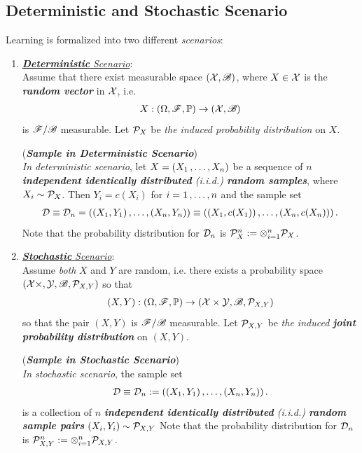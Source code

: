 \documentclass[11pt]{article}
\begin{document}
\subsection{Deterministic and Stochastic Scenario}
Learning is formalized into two different \emph{scenarios}:
\begin{enumerate}
\item  \underline{\emph{\textbf{Deterministic}} \emph{Scenario}}: \\
Assume that there exist measurable space $({\mathcal X}, {\mathscr B})$, where $X \in {\mathcal X}$ is the \emph{\textbf{random vector}} in ${\mathcal X}$, i.e. 
\begin{align*}
X: (\Omega, {\mathscr F}, {\mathbb P}) \to ({\mathcal X}, {\mathscr B})
\end{align*} is ${\mathscr F}/{\mathscr B}$ measurable. Let ${\mathcal P}_{X}$ be \emph{the induced probability distribution} on $X$.

\begin{remark} (\emph{\textbf{Sample in Deterministic Scenario}})\\
\emph{In deterministic scenario}, let $X = \left(X_1 \,{,}\ldots{,}\, X_n\right)$ be a sequence of $n$ \emph{\textbf{independent identically distributed} (i.i.d.) \textbf{random samples}}, where $X_i \sim {\mathcal P}_X$. Then $Y_i = c(X_i)$ for $i=1 \,{,}\ldots{,}\, n$ and the sample set
\begin{align*}
{\mathcal D} \equiv {\mathcal D}_n = \left((X_1, Y_1) \,{,}\ldots{,}\, (X_n, Y_n)\right) \equiv  \left((X_1, c(X_1)) \,{,}\ldots{,}\, (X_n, c(X_n))\right) .
\end{align*} Note that the probability distribution for ${\mathcal D}_n$ is ${\mathcal P}_X^n := \otimes_{i=1}^n{\mathcal P}_X$.
\end{remark}

\item  \underline{\emph{\textbf{Stochastic}} \emph{Scenario}}: \\
Assume \emph{both} $X$ and $Y$ are random, i.e. there exists a  probability space $({\mathcal X} \times, {\mathcal Y}, {\mathscr B}, {\mathcal P}_{X,Y})$ so that
\begin{align*}
(X, Y): (\Omega, {\mathscr F}, {\mathbb P}) \to ({\mathcal X} \times {\mathcal Y}, {\mathscr B}, {\mathcal P}_{X,Y} )
\end{align*} so that the pair $(X, Y)$ is ${\mathscr F}/{\mathscr B}$ measurable. Let ${\mathcal P}_{X, Y}$ be \emph{the induced \textbf{joint probability distribution}} on $(X, Y)$.

\begin{remark} (\emph{\textbf{Sample in Stochastic Scenario}})\\
\emph{In stochastic scenario}, the sample set 
\begin{align*}
{\mathcal D} \equiv {\mathcal D}_n:= \left((X_1, Y_1) \,{,}\ldots{,}\, (X_n, Y_n)\right).
\end{align*} is a collection of $n$ \emph{\textbf{independent identically distributed} (i.i.d.) \textbf{random sample pairs}} $(X_i, Y_i) \sim {\mathcal P}_{X, Y}$
Note that  the probability distribution for ${\mathcal D}_n$ is ${\mathcal P}_{X,Y}^n := \otimes_{i=1}^n{\mathcal P}_{X, Y}$.
\end{remark}
\end{enumerate}
\end{document}
